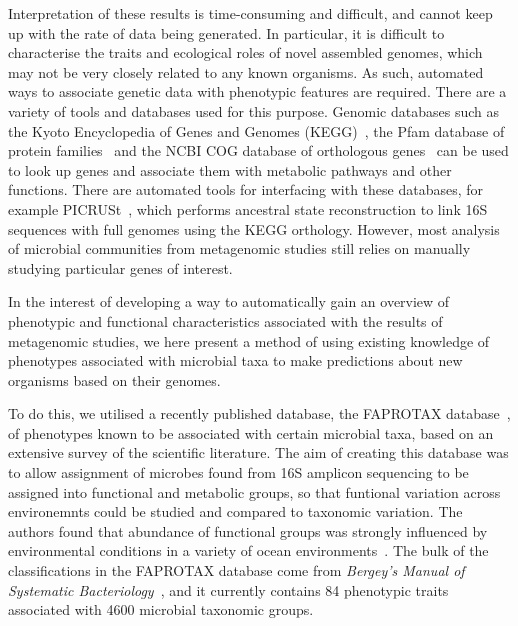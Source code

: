 \documentclass[10pt,letterpaper]{article}
\begin{document}
Interpretation of these results is time-consuming and difficult, and cannot keep up with the rate of data being generated. In particular, it is difficult to characterise the traits and ecological roles of novel assembled genomes, which may not be very closely related to any known organisms. As such, automated ways to associate genetic data with phenotypic features are required. There are a variety of tools and databases used for this purpose. Genomic databases such as the Kyoto Encyclopedia of Genes and Genomes (KEGG)~\cite{Kanehisa2017}, the Pfam database of protein families~\cite{Finn2016} and the NCBI COG database of orthologous genes~\cite{Tatusov1997} can be used to look up genes and associate them with metabolic pathways and other functions. There are automated tools for interfacing with these databases, for example PICRUSt~\cite{Langille2013}, which performs ancestral state reconstruction to link 16S sequences with full genomes using the KEGG orthology. However, most analysis of microbial communities from metagenomic studies still relies on manually studying particular genes of interest.

In the interest of developing a way to automatically gain an overview of phenotypic and functional characteristics associated with the results of metagenomic studies, we here present a method of using existing knowledge of phenotypes associated with microbial taxa to make predictions about new organisms based on their genomes.

To do this, we utilised a recently published database, the FAPROTAX database~\cite{Louca2016,Louca2017}, of phenotypes known to be associated with certain microbial taxa, based on an extensive survey of the scientific literature. The aim of creating this database was to allow assignment of microbes found from 16S amplicon sequencing to be assigned into functional and metabolic groups, so that funtional variation across environemnts could be studied and compared to taxonomic variation. The authors found that abundance of functional groups was strongly influenced by environmental conditions in a variety of ocean environments~\cite{Louca2016a}. The bulk of the classifications in the FAPROTAX database come from \emph{Bergey's Manual of Systematic Bacteriology}~\cite{Whitman}, and it currently contains 84 phenotypic traits associated with 4600 microbial taxonomic groups.
\end{document}
